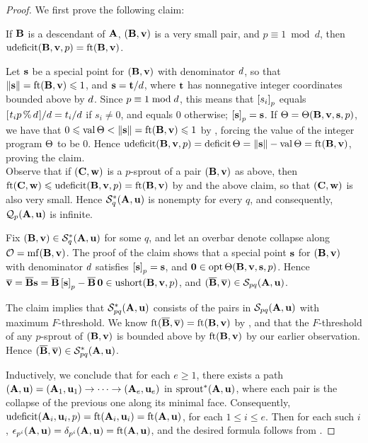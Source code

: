 \documentclass{amsart}
\begin{document}
\begin{proof}
We first prove the following claim:

\begin{claim}
   If $\mathbf{B}$ is a descendant of $\mathbf{A}$, $(\mathbf{B}, \mathbf{v})$ is a very small pair, and $p \equiv 1 \bmod d$, then $\operatorname{udeficit}(\mathbf{B}, \mathbf{v}, p) = \operatorname{ft}(\mathbf{B}, \mathbf{v})$.
\end{claim}

Let $\mathbf{s}$ be a special point for $(\mathbf{B}, \mathbf{v})$ with denominator $d$, so that $\| \mathbf{s} \| = \operatorname{ft}(\mathbf{B}, \mathbf{v}) \leqslant 1$, and $\mathbf{s} = \mathbf{t}/d$, where $\mathbf{t}$ has nonnegative integer coordinates bounded above by $d$.
Since $p \equiv 1 \bmod d$, this means that $\left[ s_i \right]_p$ equals $[ \hspace{.01in} t_i p \, \% \, d \hspace{.01in} ]/d = t_i/d$ if $s_i \neq 0$, and equals $0$ otherwise; \ie $\left[ \mathbf{s} \right]_p = \mathbf{s}$.
If $\Theta = \Theta(\mathbf{B}, \mathbf{v}, \mathbf{s}, p)$, we have that $0 \leqslant \operatorname{val} \Theta < \| \mathbf{s} \| = \operatorname{ft}(\mathbf{B}, \mathbf{v}) \leqslant 1$  by , forcing the value of the integer program $\Theta$ to be $0$.
Hence $\operatorname{udeficit}(\mathbf{B}, \mathbf{v}, p) = \operatorname{deficit} \Theta = \| \mathbf{s} \| - \operatorname{val}\Theta = \operatorname{ft}(\mathbf{B}, \mathbf{v})$, proving the claim.\\[2mm]
Observe that if $(\mathbf{C}, \mathbf{w})$ is a $p$-sprout of a pair $(\mathbf{B}, \mathbf{v})$ as above, then $\operatorname{ft}(\mathbf{C}, \mathbf{w}) \leqslant \operatorname{udeficit}(\mathbf{B}, \mathbf{v}, p) = \operatorname{ft}(\mathbf{B}, \mathbf{v})$ by  and the above claim, so that $(\mathbf{C}, \mathbf{w})$ is also very small.
Hence $\mathcal{S}^\ast_{q}(\mathbf{A}, \mathbf{u})$ is nonempty for every $q$, and consequently, $\mathcal{Q}_p(\mathbf{A},\mathbf{u})$ is infinite.

Fix $(\mathbf{B}, \mathbf{v}) \in \mathcal{S}_{q}^\ast(\mathbf{A},\mathbf{u})$ for some $q$, and let an overbar denote collapse along $\mathcal{O} = \operatorname{mf}(\mathbf{B}, \mathbf{v})$.
The proof of the claim shows that a special point $\mathbf{s}$ for $(\mathbf{B},\mathbf{v})$ with denominator $d$ satisfies $\left[ \mathbf{s} \right]_p = \mathbf{s}$, and $\mathbf{0} \in \operatorname{opt} \Theta(\mathbf{B},\mathbf{v},\mathbf{s},p)$.
Hence $\overline{\mathbf{v}} = \overline{\mathbf{B}}\mathbf{s} = \overline{\mathbf{B}}\left[ \mathbf{s} \right]_p - \overline{\mathbf{B}} \, \mathbf{0} \in \operatorname{ushort}(\mathbf{B}, \mathbf{v}, p)$, and $(\overline{\mathbf{B}}, \overline{\mathbf{v}}) \in \mathcal{S}_{pq}(\mathbf{A}, \mathbf{u})$.

The claim implies that $\mathcal{S}^\ast_{pq}(\mathbf{A}, \mathbf{u})$ consists of the pairs in $\mathcal{S}_{pq}(\mathbf{A}, \mathbf{u})$ with maximum $F$-threshold.
We know $\operatorname{ft}(\overline{\mathbf{B}}, \overline{\mathbf{v}}) = \operatorname{ft}(\mathbf{B}, \mathbf{v})$ by , and
that the $F$-threshold of any $p$-sprout of $(\mathbf{B}, \mathbf{v})$ is bounded above by $\operatorname{ft}(\mathbf{B}, \mathbf{v})$ by our earlier observation.
Hence $(\overline{\mathbf{B}}, \overline{\mathbf{v}}) \in \mathcal{S}^\ast_{pq}(\mathbf{A}, \mathbf{u})$.

Inductively, we conclude that for each $e\ge 1$, there exists a path $(\mathbf{A},\mathbf{u}) = (\mathbf{A}_1,\mathbf{u}_1) \to \cdots \to (\mathbf{A}_e,\mathbf{u}_e)$ in $\operatorname{sprout}^*(\mathbf{A},\mathbf{u})$, where each pair is the collapse of the previous one along its minimal face.
Consequently, $\operatorname{udeficit}(\mathbf{A}_i,\mathbf{u}_i,p) = \operatorname{ft}(\mathbf{A}_i, \mathbf{u}_i) = \operatorname{ft}(\mathbf{A}, \mathbf{u})$, for each $1\le i \le e$.
Then for each such $i$, $\epsilon_{p^i}(\mathbf{A},\mathbf{u}) = \delta_{p^i}(\mathbf{A},\mathbf{u}) = \operatorname{ft}(\mathbf{A}, \mathbf{u})$, and the desired formula follows from
.
\end{proof}
\end{document}
